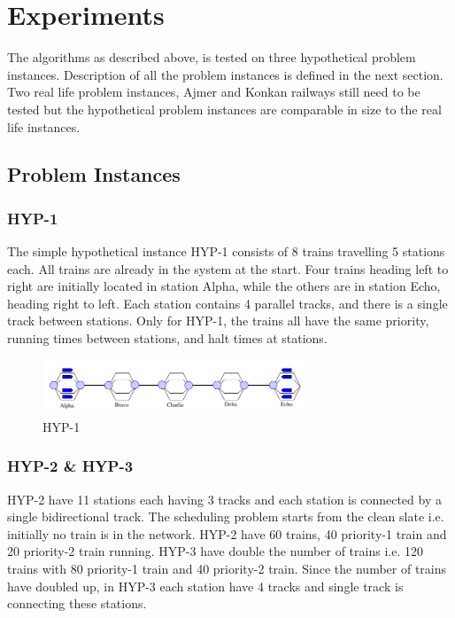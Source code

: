 \chapter {Experiments}

The algorithms as described above, is tested on three hypothetical problem instances. Description of all
the problem instances is defined in the next section. Two real life problem instances, Ajmer and Konkan 
railways still need to be tested but the hypothetical problem instances are comparable in size 
to the real life instances.

\section {Problem Instances}
\subsection{HYP-1}
The simple hypothetical instance HYP-1 consists of 8 trains
travelling 5 stations each. All trains are already
in the system at the start. Four trains heading left to right are
initially located in station Alpha, while the
others are in station Echo, heading right to left. Each station
contains 4 parallel tracks, and there is a single track between
stations. Only for HYP-1, the trains all have the same priority,
running times between stations, and halt times at stations.

\begin{figure}[h]
    \centering
    \includegraphics[width=0.7\textwidth]{Instance1}
    \caption{ HYP-1 }
    \label{image-myimage20}
\end{figure}

\subsection{HYP-2 \& HYP-3}
HYP-2 have 11 stations each having 3 tracks and each station is connected by a single bidirectional track.
The scheduling problem starts from the clean slate i.e. initially no train is in the network.
HYP-2 have 60 trains, 40 priority-1 train and 20 priority-2 train running. HYP-3 have double the number of trains 
i.e. 120 trains with 80 priority-1 train and 40 priority-2 train. Since the number of trains have 
doubled up, in HYP-3 each station have 4 tracks and single track is connecting these stations.

